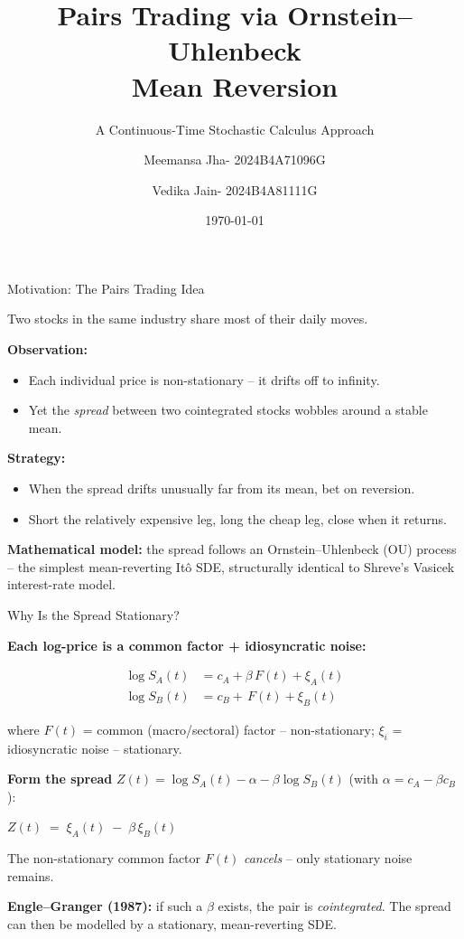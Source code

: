 \documentclass[10pt,aspectratio=169]{beamer}
\title[Pairs Trading via OU]{Pairs Trading via Ornstein--Uhlenbeck \\ Mean Reversion}
\subtitle{A Continuous-Time Stochastic Calculus Approach}
\author[Project]{Meemansa Jha- 2024B4A71096G \and Vedika Jain- 2024B4A81111G}
\institute{Stochastic Calculus and its Apllications in Finance}
\date{\today}
\begin{document}
\begin{frame}
  \titlepage
\end{frame}

\begin{frame}{Motivation: The Pairs Trading Idea}

Two stocks in the same industry share most of their daily moves.

\bigskip
\textbf{Observation:}
\begin{itemize}
  \item Each individual price is non-stationary -- it drifts off to infinity.
  \item Yet the \emph{spread} between two cointegrated stocks
        wobbles around a stable mean.
\end{itemize}

\bigskip
\textbf{Strategy:}
\begin{itemize}
  \item When the spread drifts unusually far from its mean, bet on reversion.
  \item Short the relatively expensive leg, long the cheap leg, close when it returns.
\end{itemize}

\bigskip
\textbf{Mathematical model:} the spread follows an
\textcolor{accent}{Ornstein--Uhlenbeck (OU) process} -- the simplest
mean-reverting It\^o SDE, structurally identical to Shreve's Vasicek
interest-rate model.

\end{frame}

\begin{frame}{Why Is the Spread Stationary?}

\textbf{Each log-price is a common factor + idiosyncratic noise:}

\begin{align*}
  \log S_A(t) &= c_A + \beta\,F(t) + \xi_A(t) \\
  \log S_B(t) &= c_B +     \,F(t) + \xi_B(t)
\end{align*}

where $F(t)$ = common (macro/sectoral) factor -- non-stationary; \;
$\xi_i$ = idiosyncratic noise -- stationary.

\bigskip
\textbf{Form the spread} $Z(t) = \log S_A(t) - \alpha - \beta\log S_B(t)$ \;\;(with $\alpha = c_A - \beta c_B$):

\begin{block}{}
\centering
$Z(t) \;=\; \xi_A(t) \;-\; \beta\,\xi_B(t)$
\end{block}

The non-stationary common factor $F(t)$ \emph{cancels} -- only stationary
noise remains.

\bigskip
\textbf{Engle--Granger (1987):} if such a $\beta$ exists, the pair is
\emph{cointegrated}. The spread can then be modelled by a stationary,
mean-reverting SDE.

\end{frame}
\end{document}

